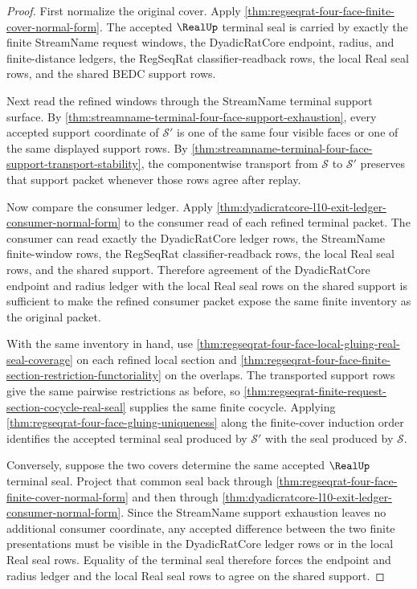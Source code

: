 \begin{proof}
First normalize the original cover. Apply
\autoref{thm:regseqrat-four-face-finite-cover-normal-form}. The accepted
$\RealUp$ terminal seal is carried by exactly the finite StreamName request
windows, the DyadicRatCore endpoint, radius, and finite-distance ledgers, the
RegSeqRat classifier-readback rows, the local Real seal rows, and the shared
BEDC support rows.

Next read the refined windows through the StreamName terminal support surface.
By \autoref{thm:streamname-terminal-four-face-support-exhaustion}, every
accepted support coordinate of $\mathcal{S}'$ is one of the same four visible
faces or one of the same displayed support rows. By
\autoref{thm:streamname-terminal-four-face-support-transport-stability}, the
componentwise transport from $\mathcal{S}$ to $\mathcal{S}'$ preserves that
support packet whenever those rows agree after replay.

Now compare the consumer ledger. Apply
\autoref{thm:dyadicratcore-l10-exit-ledger-consumer-normal-form} to the
consumer read of each refined terminal packet. The consumer can read exactly
the DyadicRatCore ledger rows, the StreamName finite-window rows, the RegSeqRat
classifier-readback rows, the local Real seal rows, and the shared support.
Therefore agreement of the DyadicRatCore endpoint and radius ledger with the
local Real seal rows on the shared support is sufficient to make the refined
consumer packet expose the same finite inventory as the original packet.

With the same inventory in hand, use
\autoref{thm:regseqrat-four-face-local-gluing-real-seal-coverage} on each
refined local section and
\autoref{thm:regseqrat-four-face-finite-section-restriction-functoriality} on
the overlaps. The transported support rows give the same pairwise restrictions
as before, so
\autoref{thm:regseqrat-finite-request-section-cocycle-real-seal} supplies the
same finite cocycle. Applying
\autoref{thm:regseqrat-four-face-gluing-uniqueness} along the finite-cover
induction order identifies the accepted terminal seal produced by
$\mathcal{S}'$ with the seal produced by $\mathcal{S}$.

Conversely, suppose the two covers determine the same accepted $\RealUp$
terminal seal. Project that common seal back through
\autoref{thm:regseqrat-four-face-finite-cover-normal-form} and then through
\autoref{thm:dyadicratcore-l10-exit-ledger-consumer-normal-form}. Since the
StreamName support exhaustion leaves no additional consumer coordinate, any
accepted difference between the two finite presentations must be visible in
the DyadicRatCore ledger rows or in the local Real seal rows. Equality of the
terminal seal therefore forces the endpoint and radius ledger and the local
Real seal rows to agree on the shared support.


\end{proof}
